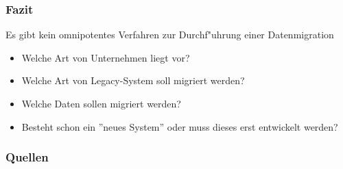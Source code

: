 \documentclass{beamer}
\begin{document}
	\begin{frame}
		\frametitle{Fazit}
		
		Es gibt kein omnipotentes Verfahren zur Durchf"uhrung einer Datenmigration
		\begin{itemize}
			\item Welche Art von Unternehmen liegt vor?
			\item Welche Art von Legacy-System soll migriert werden?
			\item Welche Daten sollen migriert werden?
			\item Besteht schon ein ''neues System'' oder muss dieses erst entwickelt werden?
		\end{itemize}
	\end{frame}
	
	
	
	\begin{frame}
		\frametitle{Quellen}
						
		
		
	\end{frame}
	
\end{document}
